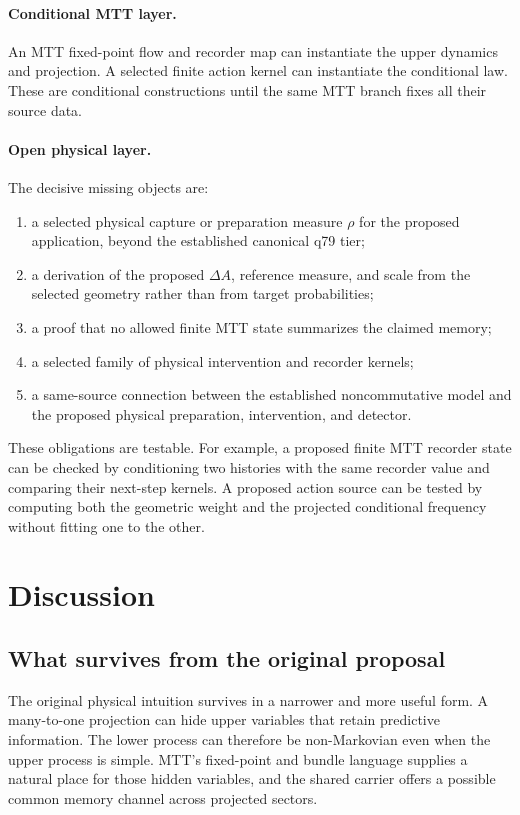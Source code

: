 \documentclass[11pt]{article}
\theoremstyle{definition}
\theoremstyle{remark}
\begin{document}
\paragraph{Conditional MTT layer.}
An MTT fixed-point flow and recorder map can instantiate the upper dynamics
and projection.  A selected finite action kernel can instantiate the
conditional law.  These are conditional constructions until the same MTT
branch fixes all their source data.

\paragraph{Open physical layer.}
The decisive missing objects are:
\begin{enumerate}[label=(O\arabic*)]
\item a selected physical capture or preparation measure \(\rho\) for the
  proposed application, beyond the established canonical q79 tier;
\item a derivation of the proposed \(\Delta A\), reference measure, and scale
  from the selected geometry rather than from target probabilities;
\item a proof that no allowed finite MTT state summarizes the claimed memory;
\item a selected family of physical intervention and recorder kernels;
\item a same-source connection between the established noncommutative
  model and the proposed physical preparation, intervention, and detector.
\end{enumerate}

These obligations are testable.  For example, a proposed finite MTT recorder
state can be checked by conditioning two histories with the same recorder
value and comparing their next-step kernels.  A proposed action source can be
tested by computing both the geometric weight and the projected conditional
frequency without fitting one to the other.

\section{Discussion}

\subsection{What survives from the original proposal}

The original physical intuition survives in a narrower and more useful form.
A many-to-one projection can hide upper variables that retain predictive
information.  The lower process can therefore be non-Markovian even when the
upper process is simple.  MTT's fixed-point and bundle language supplies a
natural place for those hidden variables, and the shared carrier offers a
possible common memory channel across projected sectors.
\end{document}
